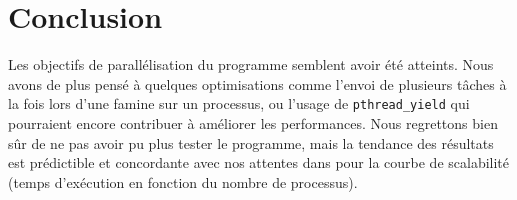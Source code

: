 \section*{Conclusion}

Les objectifs de parallélisation du programme semblent avoir été atteints. Nous avons de plus pensé à quelques optimisations comme l'envoi de plusieurs tâches à la fois lors d'une famine sur un processus, ou l'usage de \texttt{pthread\_yield} qui pourraient encore contribuer à améliorer les performances. Nous regrettons bien sûr de ne pas avoir pu plus tester le programme, mais la tendance des résultats est prédictible et concordante avec nos attentes dans pour la courbe de scalabilité (temps d'exécution en fonction du nombre de processus).